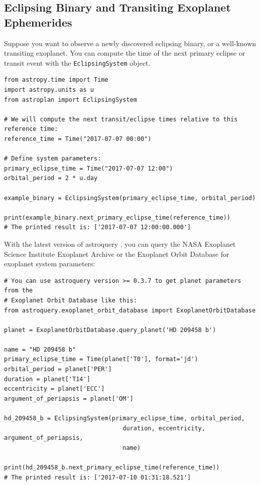 \begin{subappendices}
\section{Eclipsing Binary and Transiting Exoplanet Ephemerides} \label{sec:eb}

Suppose you want to observe a newly discovered eclipsing binary, or a well-known transiting exoplanet. You can compute the time of the next primary eclipse or transit event with the \texttt{EclipsingSystem} object. 

\begin{lstlisting}
from astropy.time import Time
import astropy.units as u
from astroplan import EclipsingSystem

# We will compute the next transit/eclipse times relative to this reference time:
reference_time = Time("2017-07-07 00:00")

# Define system parameters:
primary_eclipse_time = Time("2017-07-07 12:00")
orbital_period = 2 * u.day

example_binary = EclipsingSystem(primary_eclipse_time, orbital_period)

print(example_binary.next_primary_eclipse_time(reference_time))
# The printed result is: ['2017-07-07 12:00:00.000']
\end{lstlisting}

With the latest version of astroquery \citep{astroquery}, you can query the NASA Exoplanet Science Institute Exoplanet Archive \citep{Akeson2013} or the Exoplanet Orbit Database \citep{Wright2011, Han2014} for exoplanet system parameters:
\begin{lstlisting}
# You can use astroquery version >= 0.3.7 to get planet parameters from the 
# Exoplanet Orbit Database like this:
from astroquery.exoplanet_orbit_database import ExoplanetOrbitDatabase

planet = ExoplanetOrbitDatabase.query_planet('HD 209458 b')

name = "HD 209458 b"
primary_eclipse_time = Time(planet['T0'], format='jd')
orbital_period = planet['PER']
duration = planet['T14']
eccentricity = planet['ECC']
argument_of_periapsis = planet['OM']

hd_209458_b = EclipsingSystem(primary_eclipse_time, orbital_period,
                                 duration, eccentricity, argument_of_periapsis,
                                 name)

print(hd_209458_b.next_primary_eclipse_time(reference_time))
# The printed result is: ['2017-07-10 01:31:18.521']
\end{lstlisting}


\end{subappendices}
